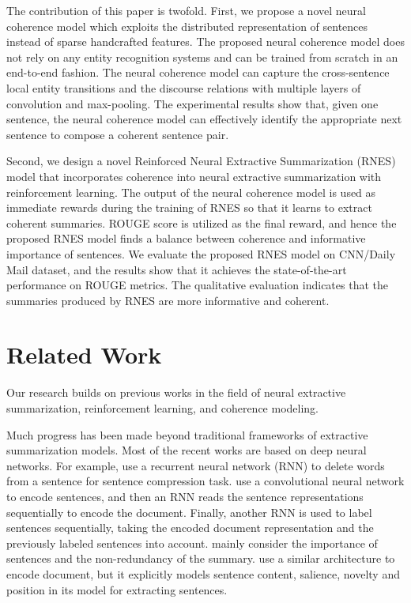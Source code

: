 \documentclass[letterpaper]{article} \usepackage{aaai18}  \usepackage{times}  \usepackage{helvet}  \usepackage{courier}  \usepackage{url}  \usepackage{graphicx}  \usepackage{amssymb}
\begin{document}
	The contribution of this paper is twofold. First, we propose a novel neural coherence model which exploits the distributed representation of sentences instead of sparse handcrafted features. The proposed neural coherence model does not rely on any entity recognition systems and can be trained from scratch in an end-to-end fashion. The neural coherence model can capture the cross-sentence local entity transitions and the discourse relations with multiple layers of convolution and max-pooling. The experimental results show that, given one sentence, the neural coherence model can effectively identify the appropriate next sentence to compose a coherent sentence pair.
	
	Second, we design a novel Reinforced Neural Extractive Summarization (RNES) model that incorporates coherence into neural extractive summarization with reinforcement learning. The output of the neural coherence model is used as immediate rewards during the training of RNES so that it learns to extract coherent summaries. ROUGE score is utilized as the final reward, and hence the proposed RNES model finds a balance between coherence and informative importance of sentences. We evaluate the proposed RNES model on CNN/Daily Mail dataset, and the results show that it achieves the state-of-the-art performance on ROUGE metrics. The qualitative evaluation indicates that the summaries produced by RNES are more informative and coherent.
	
	
	\section{Related Work}
	Our research builds on previous works in the field of neural extractive summarization, reinforcement learning, and coherence modeling.
	
	Much progress has been made beyond traditional frameworks of extractive summarization models. Most of the recent works are based on deep neural networks. For example, \cite{filippova_sentence_2015} use a recurrent neural network (RNN) to delete words from a sentence for sentence compression task. \cite{jianpeng2016} use a convolutional neural network to encode sentences, and then an RNN reads the sentence representations sequentially to encode the document. Finally, another RNN is used to label sentences sequentially, taking the encoded document representation and the previously labeled sentences into account. \cite{jianpeng2016} mainly consider the importance of sentences and the non-redundancy of the summary. \cite{SummaRuNNer} use a similar architecture to encode document, but it explicitly models sentence content, salience, novelty and position in its model for extracting sentences.
	
\end{document}
